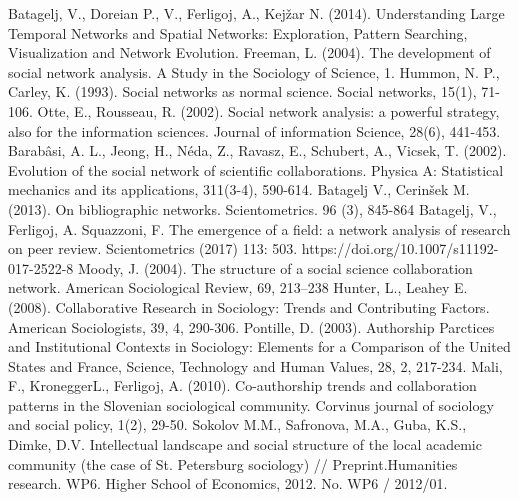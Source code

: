 \documentclass[11pt]{article} %
\begin{document}
\begin{thebibliography}{99}
Batagelj, V., Doreian P., V., Ferligoj, A., Kejžar N. (2014). Understanding Large Temporal Networks and Spatial Networks: Exploration, Pattern Searching, Visualization and Network Evolution. 
   Freeman, L. (2004). The development of social network analysis. A Study in the Sociology of Science, 1.
   Hummon, N. P., Carley, K. (1993). Social networks as normal science. Social networks, 15(1), 71-106.
   Otte, E., Rousseau, R. (2002). Social network analysis: a powerful strategy, also for the information sciences. Journal of information Science, 28(6), 441-453. 
    Barabâsi, A. L., Jeong, H., Néda, Z., Ravasz, E., Schubert, A., Vicsek, T. (2002). Evolution of the social network of scientific collaborations. Physica A: Statistical mechanics and its applications, 311(3-4), 590-614.
   Batagelj V., Cerinšek M.(2013). On bibliographic networks. Scientometrics. 96 (3), 845-864
   Batagelj, V., Ferligoj, A. Squazzoni, F. The emergence of a field: a network analysis of research on peer review. Scientometrics (2017) 113: 503. https://doi.org/10.1007/s11192-017-2522-8  
   Moody, J. (2004). The structure of a social science collaboration network. American Sociological Review, 69, 213–238
   Hunter, L., Leahey E. (2008). Collaborative Research in Sociology: Trends and Contributing Factors. American Sociologists, 39, 4, 290-306. 
   Pontille, D. (2003). Authorship Parctices and Institutional Contexts in Sociology: Elements for a Comparison of the United States and France, Science, Technology and Human Values, 28, 2, 217-234.
   Mali, F., KroneggerL., Ferligoj, A. (2010). Co-authorship trends and collaboration patterns in the Slovenian sociological community. Corvinus journal of sociology and social policy, 1(2), 29-50.
   Sokolov M.M., Safronova, M.A., Guba, K.S., Dimke, D.V. Intellectual landscape and social structure of the local academic community (the case of St. Petersburg sociology) // Preprint.Humanities research. WP6. Higher School of Economics, 2012. No. WP6 / 2012/01.

\end{thebibliography}
\end{document}
